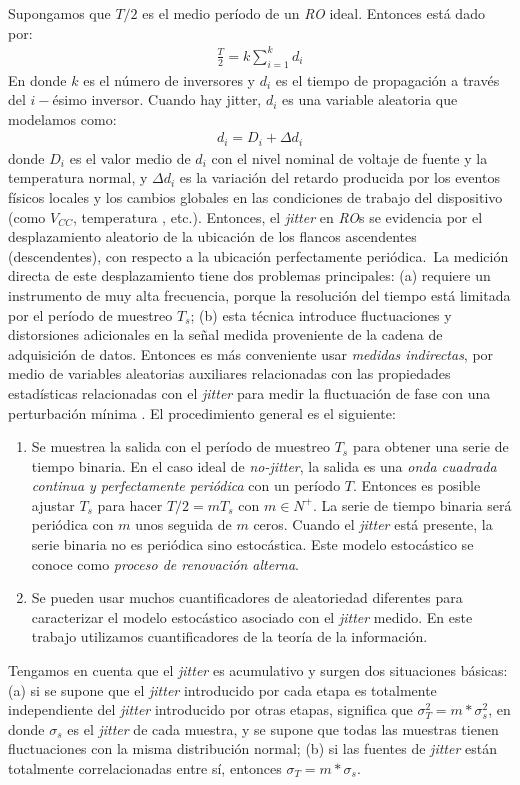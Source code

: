 Supongamos que $T/2$ es el medio período de un \emph{RO} ideal.
Entonces está dado por:
%
\begin{eqnarray}
\frac{T}{2}=k \sum_{i=1}^{k}d_i
\end{eqnarray}
%
En donde $k$ es el número de inversores y $d_i$ es el tiempo de propagación a través del $i-$ésimo inversor.
Cuando hay jitter, $d_i$ es una variable aleatoria que modelamos como:
%
\begin{eqnarray}
d_i=D_i+ \Delta d_i
\end{eqnarray}
%
donde $D_i$ es el valor medio de $d_i$ con el nivel nominal de voltaje de fuente y la temperatura normal, y $\Delta d_i$ es la variación del retardo producida por los eventos físicos locales y los cambios globales en las condiciones de trabajo del dispositivo (como $V_{CC}$, temperatura , etc.).
Entonces, el \textit{jitter} en \emph{RO}s se evidencia por el desplazamiento aleatorio de la ubicación de los flancos ascendentes (descendentes), con respecto a la ubicación perfectamente periódica.\
La medición directa de este desplazamiento tiene dos problemas principales:
(a) requiere un instrumento de muy alta frecuencia, porque la resolución del tiempo está limitada por el período de muestreo $T_s$;
(b) esta técnica introduce fluctuaciones y distorsiones adicionales en la señal medida proveniente de la cadena de adquisición de datos.
Entonces es más conveniente usar \emph{medidas indirectas}, por medio de variables aleatorias auxiliares relacionadas con las propiedades estadísticas relacionadas con el \textit{jitter} para medir la fluctuación de fase con una perturbación mínima \cite{Lubicz2014}.
El procedimiento general es el siguiente:
\begin{enumerate}
\item Se muestrea la salida con el período de muestreo $ T_s $ para obtener una serie de tiempo binaria.
En el caso ideal de \emph{no-jitter}, la salida es una \emph{onda cuadrada continua y perfectamente periódica} con un período $T$.
Entonces es posible ajustar $T_s$ para hacer $T/2 = mT_s $ con $m \in N^+$.
La serie de tiempo binaria será periódica con $m$ unos seguida de $m$ ceros.
Cuando el \textit{jitter} está presente, la serie binaria no es periódica sino estocástica.
Este modelo estocástico se conoce como \emph{proceso de renovación alterna}.
\item Se pueden usar muchos cuantificadores de aleatoriedad diferentes para caracterizar el modelo estocástico asociado con el \textit{jitter} medido.
En este trabajo utilizamos cuantificadores de la teoría de la información.
\end{enumerate}
Tengamos en cuenta que el \textit{jitter} es acumulativo y surgen dos situaciones básicas:
(a) si se supone que el \textit{jitter} introducido por cada etapa es totalmente independiente del \textit{jitter} introducido por otras etapas, significa que  $\sigma_T^2=m*\sigma_s^2$, en donde $\sigma_s$ es el \textit{jitter} de cada muestra, y se supone que todas las muestras tienen fluctuaciones con la misma distribución normal;
(b) si las fuentes de \textit{jitter} están totalmente correlacionadas entre sí, entonces $\sigma_T=m*\sigma_s$.